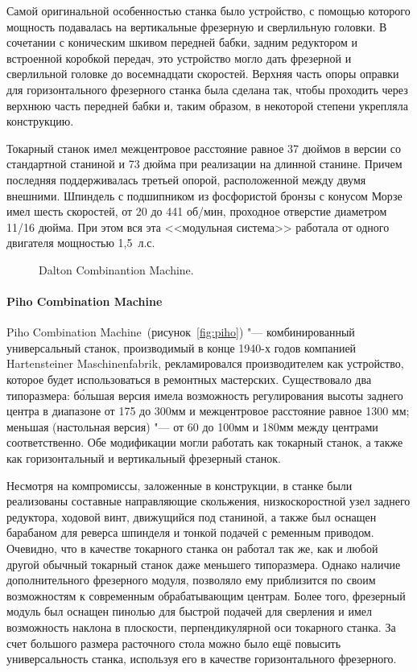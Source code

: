 Самой оригинальной особенностью станка было устройство, с помощью которого мощность подавалась на вертикальные фрезерную и сверлильную головки. В сочетании с коническим шкивом передней бабки, задним редуктором и встроенной коробкой передач, это устройство могло дать фрезерной и сверлильной головке до восемнадцати скоростей. Верхняя часть опоры оправки для горизонтального фрезерного станка была сделана так, чтобы проходить через верхнюю часть передней бабки и, таким образом, в некоторой степени укрепляла конструкцию.

Токарный станок имел межцентровое расстояние равное 37 дюймов в версии со стандартной станиной и 73 дюйма при реализации на длинной станине. Причем последняя поддерживалась третьей опорой, расположенной между двумя внешними. Шпиндель с подшипником из фосфористой бронзы с конусом Морзе имел шесть скоростей, от 20 до 441 об/мин, проходное отверстие диаметром 11/16 дюйма. При этом вся эта <<модульная система>> работала от одного двигателя мощностью 1,5~л.\:с.

\begin{figure}[ht]
	\caption{Dalton Combinantion Machine.}\label{fig:dalton}
\end{figure}

\paragraph{Piho Combination Machine}

Piho Combination Machine~(рисунок~\cref{fig:piho}) "--- комбинированный универсальный станок, производимый в конце 1940-х годов компанией Hartensteiner Maschinenfabrik, рекламировался производителем как устройство, которое будет использоваться в ремонтных мастерских. Существовало два типоразмера: б\'ольшая версия имела возможность регулирования высоты заднего центра в диапазоне от 175 до 300\:мм и межцентровое расстояние равное 1300 мм; меньшая (настольная версия) "--- от 60 до 100\:мм и 180\:мм между центрами соответственно. Обе модификации могли работать как токарный станок, а также как горизонтальный и вертикальный фрезерный станок.

Несмотря на компромиссы, заложенные в конструкции, в станке были реализованы составные направляющие скольжения, низкоскоростной узел заднего редуктора, ходовой винт, движущийся под станиной, а также был оснащен барабаном для реверса шпинделя и тонкой подачей с ременным приводом. Очевидно, что в качестве токарного станка он работал так же, как и любой другой обычный токарный станок даже меньшего типоразмера. Однако наличие дополнительного фрезерного модуля, позволяло ему приблизится по своим возможностям к современным обрабатывающим центрам. Более того, фрезерный модуль был оснащен пинолью для быстрой подачей для сверления и имел возможность наклона в плоскости, перпендикулярной оси токарного станка. За счет большого размера расточного стола можно было ещё повысить универсальность станка, используя его в качестве горизонтального фрезерного.

